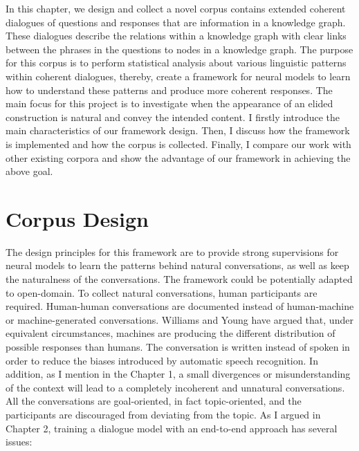 \documentclass[bsc,frontabs,twoside,singlespacing,parskip,deptreport]{infthesis}     %
\begin{document}
In this chapter, we design and collect a novel corpus contains extended coherent dialogues of questions and responses that are information in a knowledge graph. These dialogues describe the relations within a knowledge graph with clear links between the phrases in the questions to nodes in a knowledge graph. The purpose for this corpus is to perform statistical analysis about various linguistic patterns within coherent dialogues, thereby, create a framework for neural models to learn how to understand these patterns and produce more coherent responses. The main focus for this project is to investigate when the appearance of an elided construction is natural and convey the intended content. I firstly introduce the main characteristics of our framework design. Then, I discuss how the framework is implemented and how the corpus is collected. Finally, I compare our work with other existing corpora and show the advantage of our framework in achieving the above goal.


\section{Corpus Design}

The design principles for this framework are to provide strong supervisions for neural models to learn the patterns behind natural conversations, as well as keep the naturalness of the conversations. The framework could be potentially adapted to open-domain. To collect natural conversations, human participants are required. Human-human conversations are documented instead of human-machine or machine-generated conversations. Williams and Young\cite{williams2007partially} have argued that, under equivalent circumstances, machines are producing the different distribution of possible responses than humans. The conversation is written instead of spoken in order to reduce the biases introduced by automatic speech recognition\cite{williams2007partially}. In addition, as I mention in the Chapter 1, a small divergences or misunderstanding of the context will lead to a completely incoherent and unnatural conversations. All the conversations are goal-oriented, in fact topic-oriented, and the participants are discouraged from deviating from the topic. As I argued in Chapter 2, training a dialogue model with an end-to-end approach has several issues:
\end{document}
